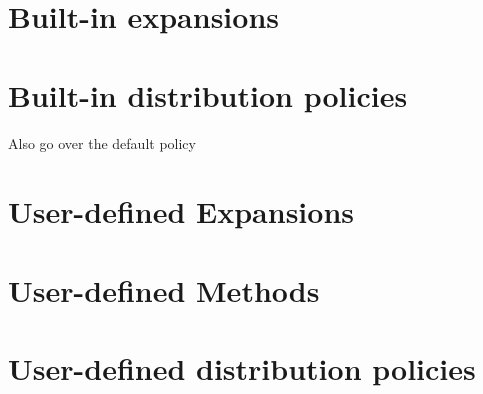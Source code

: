 \section{Built-in expansions}



\section{Built-in distribution policies}

Also go over the default policy



\section{User-defined Expansions}



\section{User-defined Methods}



\section{User-defined distribution policies}
